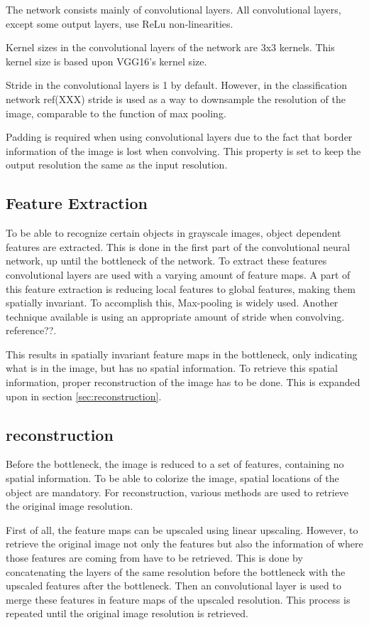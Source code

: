 The network consists mainly of convolutional layers. All convolutional layers, except some output layers, use ReLu non-linearities. 

Kernel sizes in the convolutional layers of the network are 3x3 kernels. This kernel size is based upon VGG16's \cite{Simonyan} kernel size.

Stride in the convolutional layers is 1 by default. However, in the classification network {\color{red} ref(XXX)} stride is used as a way to downsample the resolution of the image, comparable to the function of max pooling. %

Padding is required when using convolutional layers due to the fact that border information of the image is lost when convolving. This property is set to keep the output resolution the same as the input resolution. 


\subsection{Feature Extraction}
To be able to recognize certain objects in grayscale images, object dependent features are extracted. 
This is done in the first part of the convolutional neural network, up until the bottleneck of the network.
To extract these features convolutional layers are used with a varying amount of feature maps. A part of this feature extraction is reducing local features to global features, making them spatially invariant. To accomplish this, Max-pooling is widely used. Another technique available is using an appropriate amount of stride when convolving. {\color{red}reference??}.

This results in spatially invariant feature maps in the bottleneck, only indicating what is in the image, but has no spatial information. To retrieve this spatial information, proper reconstruction of the image has to be done. This is expanded upon in section \ref{sec:reconstruction}.

\subsection{reconstruction}
Before the bottleneck, the image is reduced to a set of features, containing no spatial information. To be able to colorize the image, spatial locations of the object are mandatory. For reconstruction, various methods are used to retrieve the original image resolution.

First of all, the feature maps can be upscaled using linear upscaling. However, to retrieve the original image not only the features but also the information of where those features are coming from have to be retrieved. This is done by concatenating the layers of the same resolution before the bottleneck with the upscaled features after the bottleneck. Then an convolutional layer is used to merge these features in feature maps of the upscaled resolution. This process is repeated until the original image resolution is retrieved.

